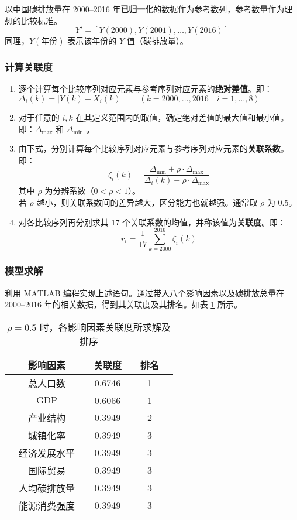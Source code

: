       以中国碳排放量在 2000--2016 年\textbf{已归一化}的数据作为参考数列，参考数量作为理想的比较标准。
      \[
        Y' = [Y(2000),Y(2001),\ldots,Y(2016)]
      \]
      同理，$Y(\text{年份})$ 表示该年份的 $Y$ 值（碳排放量）。

    \subsubsection{计算关联度}
      \begin{enumerate}
        \item 逐个计算每个比较序列对应元素与参考序列对应元素的\textbf{绝对差值}。即：$\Delta_i(k)=|Y(k)-X_i(k)|\qquad (k=2000,\dots,2016\quad i=1,\dots,8)$
        \item 对于任意的 $i,k$ 在其定义范围内的取值，确定绝对差值的最大值和最小值。即：$\Delta_\text{max}$ 和 $\Delta_\text{min}$ 。
        \item 由下式，分别计算每个比较序列对应元素与参考序列对应元素的\textbf{关联系数}。即：
          \[
            \zeta_i(k)=\frac{\Delta_\text{min}+\rho\cdot\Delta_\text{max}}{\Delta_i(k)+\rho\cdot\Delta_\text{max}}
          \]
          其中 $\rho$ 为分辨系数（$0<\rho<1$）。\\
          若 $\rho$ 越小，则关联系数间的差异越大，区分能力也就越强。通常取 $\rho$ 为 0.5。
        \item 对各比较序列再分别求其 17 个关联系数的均值，并称该值为\textbf{关联度}。即：
          \[
            r_i=\frac{1}{17}\sum_{k=2000}^{2016} \zeta_i(k)
          \]
      \end{enumerate}

    \subsubsection{模型求解}
      利用 $\mathrm{MATLAB}$ 编程实现上述语句。通过带入八个影响因素以及碳排放总量在 2000--2016 年的相关数据，得到其关联度及其排名。如表 \ref{tab:guanlianxu0.5} 所示。
      \begin{table}[htb]
        \centering
        \caption{$\rho=0.5$ 时，各影响因素关联度所求解及排序}
        \begin{tabular*}{0.618\paperwidth}{@{\extracolsep{\fill}}ccccccc}
          \toprule[1.5pt]
          &影响因素 && 关联度 && 排名 &\\
          \midrule[1pt]
          &总人口数 && 0.6746 && 1 &\\
          &$\mathrm{GDP}$ && 0.6066 && 1 &\\
          &产业结构 && 0.3949 && 2 &\\
          &城镇化率 && 0.3949 && 3 &\\
          &经济发展水平 && 0.3949 && 3 &\\
          &国际贸易 && 0.3949 && 3 &\\
          &人均碳排放量 && 0.3949 && 3 &\\
          &能源消费强度 && 0.3949 && 3 &\\
          \bottomrule[1.5pt]
        \end{tabular*}
        \label{tab:guanlianxu0.5}
      \end{table}

